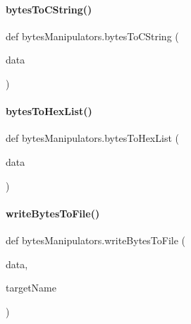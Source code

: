 \paragraph{\texorpdfstring{bytes\+To\+C\+String()}{bytesToCString()}}
{\footnotesize\ttfamily def bytes\+Manipulators.\+bytes\+To\+C\+String (\begin{DoxyParamCaption}\item[{}]{data }\end{DoxyParamCaption})}

\mbox{\label{namespacebytes_manipulators_a4cd5a54a23d33c32af9524eb31bbe1d0}} 
\paragraph{\texorpdfstring{bytes\+To\+Hex\+List()}{bytesToHexList()}}
{\footnotesize\ttfamily def bytes\+Manipulators.\+bytes\+To\+Hex\+List (\begin{DoxyParamCaption}\item[{}]{data }\end{DoxyParamCaption})}

\mbox{\label{namespacebytes_manipulators_a2a3a7daebf72b630c1197254cc7eda9f}} 
\paragraph{\texorpdfstring{write\+Bytes\+To\+File()}{writeBytesToFile()}}
{\footnotesize\ttfamily def bytes\+Manipulators.\+write\+Bytes\+To\+File (\begin{DoxyParamCaption}\item[{}]{data,  }\item[{}]{target\+Name }\end{DoxyParamCaption})}

